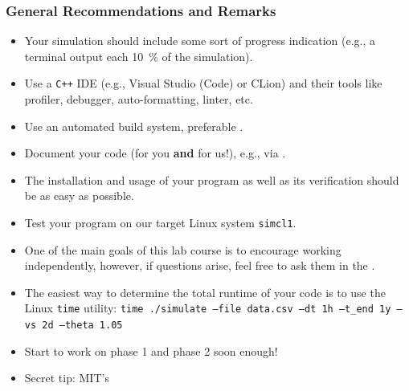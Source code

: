 \begin{frame}[fragile]
  \frametitle{General Recommendations and Remarks}
  \begin{itemize}
    \item Your simulation should include some sort of progress indication (e.g., a terminal output each \SI{10}{\percent} of the simulation).
    \item Use a \texttt{C++} IDE (e.g., Visual Studio (Code) or CLion) and their tools like profiler, debugger, auto-formatting, linter, etc.
    \item Use an automated build system, preferable .
    \item Document your code (for you \textbf{and} for us!), e.g., via .
    \item The installation and usage of your program as well as its verification should be as easy as possible.
    \item Test your program on our target Linux system \texttt{simcl1}.
    \item One of the main goals of this lab course is to encourage working independently, however, if questions arise, feel free to ask them in the .
    \item The easiest way to determine the total runtime of your code is to use the Linux \texttt{time} utility: \texttt{time ./simulate --file data.csv --dt 1h --t_end 1y --vs 2d --theta 1.05}
    \item Start to work on phase 1 and phase 2 soon enough!
    \item Secret tip: MIT's 
  \end{itemize}
\end{frame}

